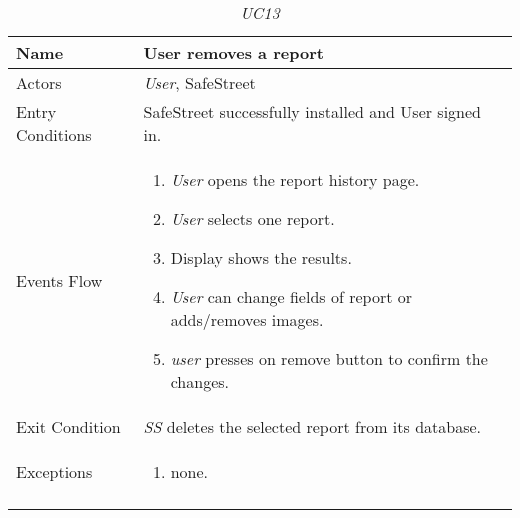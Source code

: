 \documentclass[../../../RASD.tex]{subfiles}
\begin{document}
    \begin{center}
    \begin{longtable}{| p{.35\linewidth} | p{.65\linewidth} |}
    \hline
    \textbf{Name} & \textbf{User removes a report}\\ \hline
    Actors & \textit{User}, SafeStreet\\ \hline
    Entry Conditions & SafeStreet successfully installed and User signed in.\\ \hline
    Events Flow &
    \begin{enumerate}
    \item \textit{User} opens the report history page.
    \item \textit{User} selects one report.
    \item  Display shows the results.
    \item \textit{User} can change fields of report or adds/removes images.
    \item \textit{user} presses on remove button to confirm the changes.
    \end{enumerate}
    \\ \hline
    Exit Condition & \textit{SS} deletes the selected report from its database.\\ \hline
    Exceptions &
    \begin{enumerate}
    \item none.
    \end{enumerate}
    \\
    \hline
    \caption[\textit{Use Case 13}]{\textit{UC13}}
    \end{longtable}
    \end{center}
    \newpage
\end{document}
